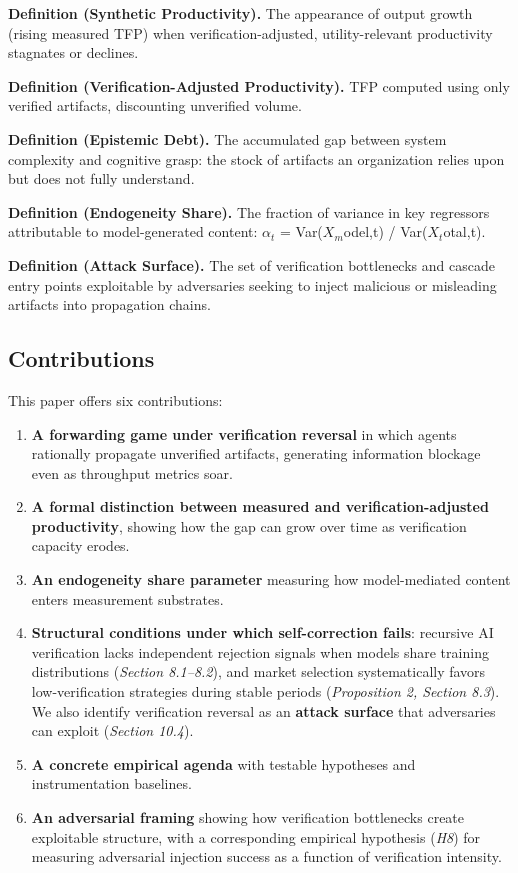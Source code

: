 \documentclass[11pt,a4paper]{article}
\providecommand{\tightlist}{\setlength{\itemsep}{0pt}\setlength{\parskip}{0pt}}
\begin{document}
\textbf{Definition (Synthetic Productivity).} The appearance of output growth (rising measured TFP) when verification-adjusted, utility-relevant productivity stagnates or declines.

\textbf{Definition (Verification-Adjusted Productivity).} TFP computed using only verified artifacts, discounting unverified volume.

\textbf{Definition (Epistemic Debt).} The accumulated gap between system complexity and cognitive grasp: the stock of artifacts an organization relies upon but does not fully understand.

\textbf{Definition (Endogeneity Share).} The fraction of variance in key regressors attributable to model-generated content: $\alpha_{t}$ = Var($X_m$odel,t) / Var($X_t$otal,t).

\textbf{Definition (Attack Surface).} The set of verification bottlenecks and cascade entry points exploitable by adversaries seeking to inject malicious or misleading artifacts into propagation chains.

\hypertarget{contributions}{%
\subsection{ Contributions}\label{contributions}}

This paper offers six contributions:

\begin{enumerate}
\def\labelenumi{\arabic{enumi}.}
\tightlist
\item
  \textbf{A forwarding game under verification reversal} in which agents rationally propagate unverified artifacts, generating information blockage even as throughput metrics soar.
\item
  \textbf{A formal distinction between measured and verification-adjusted productivity}, showing how the gap can grow over time as verification capacity erodes.
\item
  \textbf{An endogeneity share parameter} measuring how model-mediated content enters measurement substrates.
\item
  \textbf{Structural conditions under which self-correction fails}: recursive AI verification lacks independent rejection signals when models share training distributions (\emph{Section 8.1--8.2}), and market selection systematically favors low-verification strategies during stable periods (\emph{Proposition 2, Section 8.3}). We also identify verification reversal as an \textbf{attack surface} that adversaries can exploit (\emph{Section 10.4}).
\item
  \textbf{A concrete empirical agenda} with testable hypotheses and instrumentation baselines.
\item
  \textbf{An adversarial framing} showing how verification bottlenecks create exploitable structure, with a corresponding empirical hypothesis (\emph{H8}) for measuring adversarial injection success as a function of verification intensity.
\end{enumerate}
\end{document}
